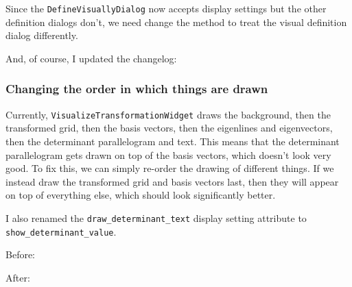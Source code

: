 \documentclass[../development.tex]{subfiles}
\begin{document}


Since the \texttt{DefineVisuallyDialog} now accepts display settings but the other definition dialogs don't, we need change the  method to treat the visual definition dialog differently.


And, of course, I updated the changelog:


\subsubsection{Changing the order in which things are drawn\label{development:making-v0.2.2:changing-the-order-in-which-things-are-drawn}}

Currently, \texttt{VisualizeTransformationWidget} draws the background, then the transformed grid, then the basis vectors, then the eigenlines and eigenvectors, then the determinant parallelogram and text. This means that the determinant parallelogram gets drawn on top of the basis vectors, which doesn't look very good. To fix this, we can simply re-order the drawing of different things. If we instead draw the transformed grid and basis vectors last, then they will appear on top of everything else, which should look significantly better.

I also renamed the \texttt{draw_determinant_text} display setting attribute to \texttt{show_determinant_value}.

Before:

After:
\end{document}
